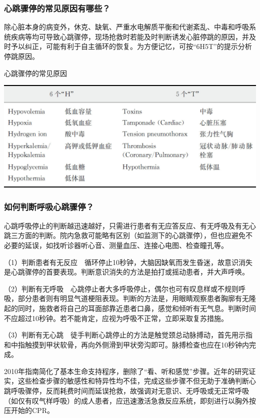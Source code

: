 \subsubsection{心跳骤停的常见原因有哪些？}

除心脏本身的病变外，休克、缺氧、严重水电解质平衡和代谢紊乱、中毒和呼吸系统疾病等均可导致心跳骤停，现场抢救时若能及时判断诱发心脏停跳的原因，并及时予以纠正，可能有利于自主循环的恢复。为方便记忆，可按“6H5T”的提示分析停跳原因。

\begin{table}[htbp]
\centering
\caption{心跳骤停的常见原因}
\label{tab17-1}
\includegraphics{./images/Image00137.jpg}
\end{table}

\subsubsection{如何判断呼吸心跳骤停？}

心跳呼吸停止的判断越迅速越好，只需进行患者有无应答反应、有无呼吸及有无心跳三方面的判断。院内急救可能略有区别（如监测下的心跳骤停），但也应避免不必要的延误，如找听诊器听心音、测量血压、连接心电图、检查瞳孔等。

（1）判断患者有无反应　循环停止10秒钟，大脑因缺氧而发生昏迷，故意识消失是心跳骤停的首要表现。判断意识消失的方法是拍打或摇动患者，并大声呼唤。

（2）判断有无呼吸　心跳停止者大多呼吸停止，偶尔也可有叹息样或不规则呼吸，部分患者则有明显气道梗阻表现。判断的方法是，用眼睛观察患者胸廓有无隆起的同时，施救者将自己的耳面部靠近患者口鼻，感觉和倾听有无气息。判断时间不应超过10秒钟。若不能肯定，应视为呼吸不正常，立即采取复苏措施。

（3）判断有无心跳　徒手判断心跳停止的方法是触觉颈总动脉搏动，首先用示指和中指触摸到甲状软骨，再向外侧滑到甲状旁沟即可。脉搏检查也应在10秒钟内完成。

2010年指南简化了基本生命支持程序，删除了“看、听和感觉”步骤。近年的研究证实，这些检查步骤的敏感性和特异性均不佳，完成这些步骤不但无助于准确判断心跳呼吸骤停，反而耗费时间而延误抢救，故强调对无意识、无呼吸或无正常呼吸（如仅有叹气样呼吸）的成人患者，应迅速激活急救反应系统，即刻进行以胸外按压开始的CPR。


